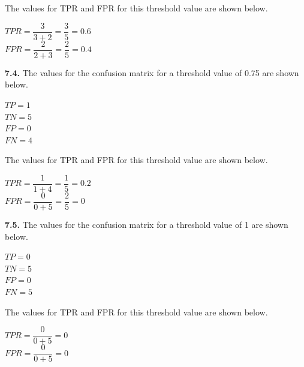 \documentclass[12pt]{article}
\begin{document}
The values for TPR and FPR for this threshold value are shown below.

\begin{center}

$TPR=\dfrac{3}{3+2}=\dfrac{3}{5}=0.6$\\
\bigskip
$FPR=\dfrac{2}{2+3}=\dfrac{2}{5}=0.4$\\

\end{center}

{\bf 7.4.} The values for the confusion matrix for a threshold value of 0.75 are shown below.

\begin{center}

$TP=1$\\
$TN=5$\\
$FP=0$\\
$FN=4$\\

\end{center}

The values for TPR and FPR for this threshold value are shown below.

\begin{center}

$TPR=\dfrac{1}{1+4}=\dfrac{1}{5}=0.2$\\
\bigskip
$FPR=\dfrac{0}{0+5}=\dfrac{2}{5}=0$\\

\end{center}

{\bf 7.5.} The values for the confusion matrix for a threshold value of 1 are shown below.

\begin{center}

$TP=0$\\
$TN=5$\\
$FP=0$\\
$FN=5$\\

\end{center}

The values for TPR and FPR for this threshold value are shown below.

\begin{center}

$TPR=\dfrac{0}{0+5}=0$\\
\bigskip
$FPR=\dfrac{0}{0+5}=0$\\

\end{center}
\end{document}
